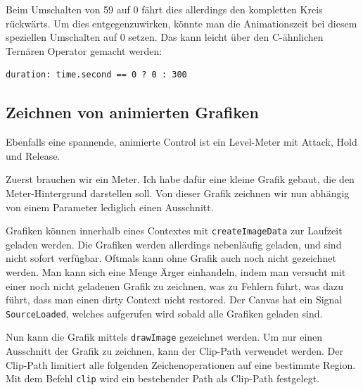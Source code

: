 \documentclass[a4paper]{article}
\begin{document}
Beim Umschalten von 59 auf 0 fährt dies allerdings den kompletten Kreis rückwärts. Um dies entgegenzuwirken, könnte man die Animationszeit bei diesem speziellen Umschalten auf 0 setzen. Das kann leicht über den C-ähnlichen Ternären Operator gemacht werden:

\begin{verbatim}
duration: time.second == 0 ? 0 : 300
\end{verbatim}
\subsection{Zeichnen von animierten Grafiken}
\label{sec-3-4}
Ebenfalls eine spannende, animierte Control ist ein Level-Meter mit Attack, Hold und Release.

Zuerst brauchen wir ein Meter. Ich habe dafür eine kleine Grafik gebaut, die den Meter-Hintergrund darstellen soll. Von dieser Grafik zeichnen wir nun abhängig von einem Parameter lediglich einen Ausschnitt.

Grafiken können innerhalb eines Contextes mit \verb~createImageData~ zur Laufzeit geladen werden. Die Grafiken werden allerdings nebenläufig geladen, und sind nicht sofort verfügbar. Oftmals kann ohne Grafik auch noch nicht gezeichnet werden. Man kann sich eine Menge Ärger einhandeln, indem man versucht mit einer noch nicht geladenen Grafik zu zeichnen, was zu Fehlern führt, was dazu führt, dass man einen dirty Context nicht restored. Der Canvas hat ein Signal \verb~SourceLoaded~, welches aufgerufen wird sobald alle Grafiken geladen sind.

Nun kann die Grafik mittels \verb~drawImage~ gezeichnet werden. Um nur einen Ausschnitt der Grafik zu zeichnen, kann der Clip-Path verwendet werden. Der Clip-Path limitiert alle folgenden Zeichenoperationen auf eine bestimmte Region. Mit dem Befehl \verb~clip~ wird ein bestehender Path als Clip-Path festgelegt.
\end{document}
